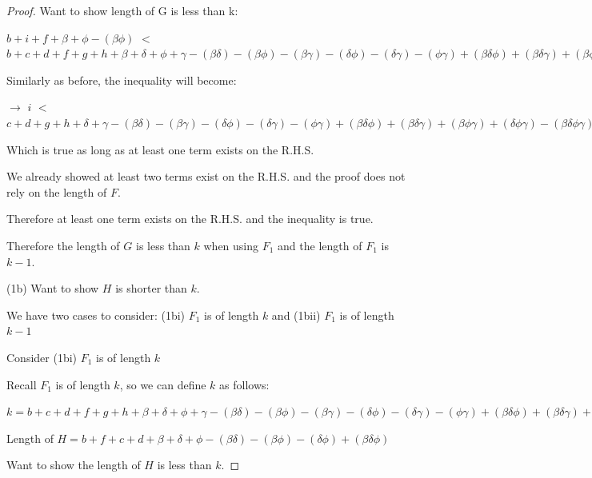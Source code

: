 \documentclass[manuscript]{acmart}
\begin{document}
\begin{proof}
        Want to show length of G is less than k:

        $b + i + f + \beta + \phi - (\beta \phi)$
        $<$
        $b + c + d + f + g + h 
        + \beta + \delta + \phi + \gamma
        - (\beta \delta) - (\beta \phi) - (\beta \gamma) - (\delta \phi) - (\delta \gamma) - (\phi \gamma)
        + (\beta \delta \phi) + (\beta \delta \gamma) + (\beta \phi \gamma) + (\delta \phi \gamma)
        - (\beta \delta \phi \gamma) 
        + 1
        $

        Similarly as before, the inequality will become:

        $\rightarrow$ $i$
        $<$
        $c + d + g + h 
         + \delta + \gamma
        - (\beta \delta) - (\beta \gamma) - (\delta \phi) - (\delta \gamma) - (\phi \gamma)
        + (\beta \delta \phi) + (\beta \delta \gamma) + (\beta \phi \gamma) + (\delta \phi \gamma)
        - (\beta \delta \phi \gamma) 
        + 1
        $

        Which is true as long as at least one term exists on the R.H.S.

        We already showed at least two terms exist on the R.H.S. and the proof does not rely on the length of $F$.

        Therefore at least one term exists on the R.H.S. and the inequality is true.

        Therefore the length of $G$ is less than $k$ when using $F_1$ and the length of $F_1$ is $k - 1$.

        (1b) Want to show $H$ is shorter than $k$.

        We have two cases to consider: (1bi) $F_1$ is of length $k$ and (1bii) $F_1$ is of length $k-1$

        Consider (1bi) $F_1$ is of length $k$

        Recall $F_1$ is of length $k$, so we can define $k$ as follows:

        $k = b + c + d + f + g + h 
        + \beta + \delta + \phi + \gamma
        - (\beta \delta) - (\beta \phi) - (\beta \gamma) - (\delta \phi) - (\delta \gamma) - (\phi \gamma)
        + (\beta \delta \phi) + (\beta \delta \gamma) + (\beta \phi \gamma) + (\delta \phi \gamma)
        - (\beta \delta \phi \gamma)
        $

        Length of $H = b + f + c + d 
        + \beta + \delta + \phi
        - (\beta \delta) - (\beta \phi) - (\delta \phi)
        + (\beta \delta \phi) $

        Want to show the length of $H$ is less than $k$.


\end{proof}
\end{document}
